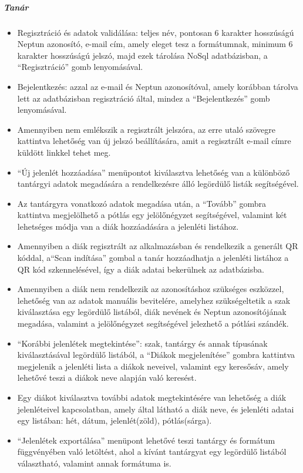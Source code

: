 \documentclass[12pt]{article}
\numberwithin{figure}{section}
\numberwithin{equation}{section}
\begin{document}
\subparagraph*{Tanár}
\begin{itemize}
	\item {Regisztráció és adatok validálása: teljes név, pontosan 6 karakter hosszúságú Neptun azonosító, e-mail cím, amely eleget tesz a formátumnak, minimum 6 karakter hosszúságú jelszó, majd ezek tárolása NoSql adatbázisban, a \enquote{Regisztráció} gomb lenyomásával.}
	\item {Bejelentkezés: azzal az e-mail és Neptun azonosítóval, amely korábban tárolva lett az adatbázisban regisztráció által, mindez a \enquote{Bejelentkezés} gomb lenyomásával.}
	\item{Amennyiben nem emlékszik a regisztrált jelszóra, az erre utaló szövegre kattintva lehetőség van új jelszó beállítására, amit a regisztrált e-mail címre küldött linkkel tehet meg.}
	\item {\enquote{Új jelenlét hozzáadása} menüpontot kiválasztva lehetőség van a különböző tantárgyi adatok megadására a rendelkezésre álló legördülő listák segítségével.}
	\item {Az tantárgyra vonatkozó adatok megadása után, a \enquote{Tovább} gombra kattintva megjelölhető a pótlás egy jelölőnégyzet segítségével, valamint két lehetséges módja van a diák hozzáadására a jelenléti listához.}
	\item{Amennyiben a diák regisztrált az alkalmazásban és rendelkezik a generált QR kóddal, a\enquote{Scan indítása} gombal a tanár hozzáadhatja a jelenléti listához a QR kód szkennelésével, így a diák adatai bekerülnek az adatbázisba.}
	\item {Amennyiben a diák nem rendelkezik az azonosításhoz szükséges eszközzel, lehetőség van az adatok manuális bevitelére, amelyhez szükségeltetik a szak kiválasztása egy legördülő listából, diák nevének és Neptun azonosítójának megadása, valamint a jelölőnégyzet segítségével jelezhető a pótlási szándék.}
	\item {\enquote{Korábbi jelenlétek megtekintése}: szak, tantárgy és annak típusának kiválasztásával legördülő listából, a 
	\enquote{Diákok megjelenítése} gombra kattintva megjelenik a jelenléti lista a diákok neveivel, valamint egy keresősáv, amely lehetővé teszi a diákok neve alapján való keresést.}
	\item {Egy diákot kiválasztva további adatok megtekintésére van lehetőség a diák jelenléteivel kapcsolatban, amely által látható a diák neve, és jelenléti adatai egy listában: hét, dátum, jelenlét(zöld), pótlás(sárga).}
	\item {\enquote{Jelenlétek exportálása} menüpont lehetővé teszi tantárgy és formátum függvényében való letöltést, ahol a kívánt tantárgyat egy legördülő listából választható, valamint annak formátuma is.}

\end{itemize}
\end{document}
